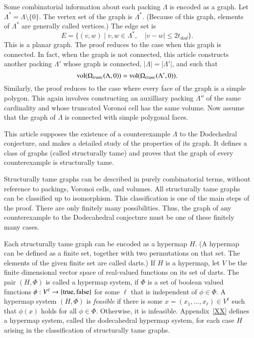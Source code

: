 Some combinatorial information about each packing $\Lambda$ is encoded
as a  graph.  Let $\Lambda^* = \Lambda\setminus\{0\}$. 
The vertex set of the graph is $\Lambda^*$.
(Because of this graph,  elements of $\Lambda^*$ are generally called vertices.)
The edge set is 
  $$
  E = \{(v,w) \mid v,w\in\Lambda^*,\quad   |v-w| \le 2t_{dod}\}.
  $$
This is a planar graph.  
The proof reduces to the case when this graph is connected.  In fact,
when the graph is not connected, this article constructs another packing
$\Lambda'$ whose graph is connected, $|\Lambda|=|\Lambda'|$, 
and such that
$$
   {\operatorname{vol}}(\Omega_{trunc}(\Lambda,0)) = {\operatorname{vol}}(\Omega_{trunc}(\Lambda',0)). 
$$
Similarly, the proof reduces to the case where every face of the graph
is a simple polygon.  This again involves constructing an auxilliary 
packing $\Lambda''$ of the same cardinality and whose  truncated Voronoi cell has the same volume.  Now assume that the graph of $\Lambda$ is 
connected with simple polygonal faces.

This article supposes the existence of a counterexample $\Lambda$ to the Dodechedral
conjecture, and makes a detailed study of the properties of its
graph.  It defines a class of graphs (called structurally tame) and
proves that the graph of every counterexample is structurally tame.

Structurally tame graphs can be described in purely combinatorial
terms, without reference to packings, Voronoi cells, and volumes.
All structurally tame graphs can be classified up to isomorphism.
This classification is one of the main steps of the proof.
There are only finitely many possibilities.  Thus, the graph
of any counterexample
to the Dodecahedral conjecture must be one of these finitely
many cases.

Each structurally tame graph can be encoded as a hypermap $H$.  (A hypermap can be defined
as a finite set, together with two permutations on that set.  The elements
of the given finite set are called darts.)  If $H$ is a hypermap,
let $V$ be the finite dimensional
vector space of real-valued functions on its set of darts.
The pair $(H,\Phi)$ is called a hypermap system, if $\Phi$ is a set of boolean
valued functions $\phi:V^\ell \to \{{\operatorname{true}},{\operatorname{false}}\}$ for
some $\ell$ that is independent of $\phi\in\Phi$.  
A hypermap system $(H,\Phi)$ 
is {\it feasible} if there is some $x=(x_1,\ldots,x_\ell)\in V^\ell$
such that $\phi(x)$ holds for all $\phi\in\Phi$.  Otherwise,
it is infeasible.   Appendix~\ref{XX} defines
a hypermap system, called the dodecahedral hypermap system, 
for each case $H$ arising in the classification of
structurally tame graphs.

